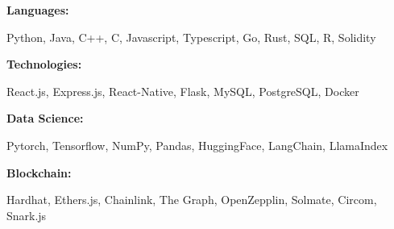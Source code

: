 \documentclass[9pt]{developercv} %
\begin{document}
\vspace{-6pt}
\begin{minipage}[t]{\linewidth}
    \vspace{-6pt}

    \hspace*{50pt}
    \begin{minipage}[t]{0.14\textwidth}
        \textbf{Languages:} 
    \end{minipage}
    \hfill
    \begin{minipage}[t]{\textwidth}
      Python, Java, C++, C, Javascript, Typescript, Go, Rust, SQL, R, Solidity
    \end{minipage}
    \vspace{0.5mm}

    \hspace*{50pt}
    \begin{minipage}[t]{0.14\textwidth}
        \textbf{Technologies:}
    \end{minipage}
    \hfill
    \begin{minipage}[t]{\textwidth}
      React.js, Express.js, React-Native, Flask, MySQL, PostgreSQL, Docker
    \end{minipage}
    \vspace{0.5mm}

    \hspace*{50pt}
    \begin{minipage}[t]{0.14\textwidth}
        \textbf{Data Science:}
    \end{minipage}
    \hfill
    \begin{minipage}[t]{\textwidth}
    Pytorch, Tensorflow, NumPy, Pandas, HuggingFace, LangChain, LlamaIndex
    \end{minipage}
    \vspace{0.5mm}

    \hspace*{50pt}
    \begin{minipage}[t]{0.14\textwidth}
    \textbf{Blockchain:}
    \end{minipage}
    \hfill
    \begin{minipage}[t]{\textwidth}
      Hardhat, Ethers.js, Chainlink, The Graph, OpenZepplin, Solmate, Circom, Snark.js
    \end{minipage}
    \vspace{0.5mm}
    
\end{minipage}
\end{document}
